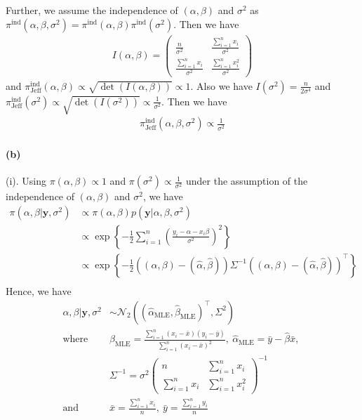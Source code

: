 Further, we assume the independence of $(\alpha, \beta)$ and $\sigma^2$ as $\pi^{\mathrm{ind}}(\alpha, \beta, \sigma^2) = \pi^{\mathrm{ind}}(\alpha, \beta) \pi^{\mathrm{ind}}(\sigma^2)$. Then we have
\begin{align*}
    I(\alpha, \beta) = 
    \begin{pmatrix}
        \frac{n}{\sigma^2} & \frac{\sum_{i=1}^n x_i}{\sigma^2} \\
        \frac{\sum_{i=1}^n x_i}{\sigma^2} & \frac{\sum_{i=1}^n x_i^2}{\sigma^2}
    \end{pmatrix}
\end{align*}
and $\pi^{\mathrm{ind}}_{\mathrm{Jeff}}(\alpha, \beta) \propto \sqrt{\det (I(\alpha, \beta))} \propto 1$. Also we have $I(\sigma^2) = \frac{n}{2\sigma^4}$ and $\pi^{\mathrm{ind}}_{\mathrm{Jeff}}(\sigma^2) \propto \sqrt{\det (I(\sigma^2))} \propto \frac{1}{\sigma^2}$. 
Then we have 
\begin{align*}
    \pi_{\mathrm{Jeff}}^{\mathrm{ind}}(\alpha, \beta, \sigma^2) \propto \frac{1}{\sigma^2}
\end{align*}

\paragraph{(b)}
(i). Using $\pi(\alpha, \beta) \propto 1$ and $\pi(\sigma^2) \propto \frac{1}{\sigma^2}$ under the assumption of the independence of $(\alpha, \beta)$ and $\sigma^2$, we have
\begin{align*}
    \pi(\alpha, \beta \vert \bm{y}, \sigma^2)
    &\propto \pi(\alpha, \beta) p(\bm{y} \vert \alpha, \beta, \sigma^2)\\
    &\propto \exp \left\{-\frac{1}{2} \sum_{i=1}^{n}\left( \frac{y_i - \alpha - x_i \beta }{\sigma^2} \right)^2 \right\}\\
    &\propto \exp\left\{-\frac{1}{2} \left((\alpha, \beta) - (\hat{\alpha}, \hat{\beta})\right) \Sigma^{-1}
        \left((\alpha, \beta) - (\hat{\alpha}, \hat{\beta})\right)^\top \right\}\\
\end{align*}
Hence, we have
\begin{align*}
    \alpha, \beta \vert \bm{y}, \sigma^2 &\sim \mathcal{N}_2\left((\hat{\alpha}_{\mathrm{MLE}}, \hat{\beta}_{\mathrm{MLE}})^\top, \Sigma^2 \right)\\
    \text{where}\ &
    \hat{\beta}_{\mathrm{MLE}} = \frac{\sum_{i=1}^{n} (x_i - \bar{x})(y_i - \bar{y})}{\sum_{i=1}^{n} (x_i - \bar{x})^2}, \ 
    \hat{\alpha}_{\mathrm{MLE}} = \bar{y} - \hat{\beta}\bar{x}, \ 
    \\
    &     \Sigma^{-1} = \sigma^2
    \begin{pmatrix}
        n & \sum_{i=1}^n x_i \\
        \sum_{i=1}^n x_i & \sum_{i=1}^n x_i^2
    \end{pmatrix}^{-1}\\
    \text{and}\ & \bar{x} = \frac{\sum_{i=1}^n x_i}{n}, \ \bar{y} = \frac{\sum_{i=1}^n y_i}{n}
\end{align*}

